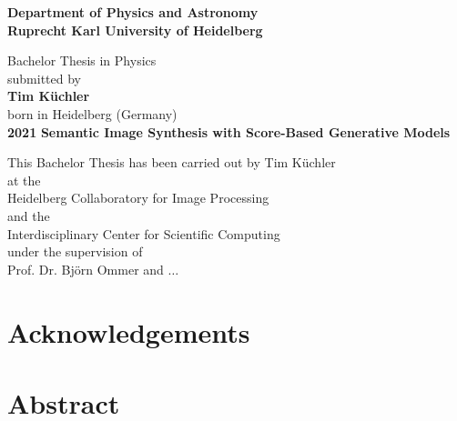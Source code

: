 \documentclass[a4paper, 12pt, oneside, BCOR=0cm]{scrbook}
\begin{document}
\begin{titlepage}
\begin{center}
    \Large\textbf{Department of Physics and Astronomy\\Ruprecht Karl University of Heidelberg}
    
    \vfill
    
    \large
    Bachelor Thesis in Physics\\
    submitted by\\
    \vspace{0.5cm}
    \Large\textbf{Tim Küchler}\\
    \normalsize
    \vspace{0.5cm}
    born in Heidelberg (Germany)\\
    \vspace{0.5cm}
    \Large\textbf{2021}
    \normalsize
    \afterpage{\blankpage}
    \newpage
    \thispagestyle{empty}
    \Large\textbf{Semantic Image Synthesis with Score-Based Generative Models}
    
    \vfill
    
    \large
    This Bachelor Thesis has been carried out by Tim Küchler\\
    at the\\
    Heidelberg Collaboratory for Image Processing\\
    and the\\
    Interdisciplinary Center for Scientific Computing\\
    under the supervision of\\
    Prof. Dr. Björn Ommer and $\dots$
    \afterpage{\blankpage}
\end{center}
\end{titlepage}
%
\frontmatter

\chapter*{Acknowledgements}
\thispagestyle{empty}

\afterpage{\blankpage}

\chapter*{Abstract}

\thispagestyle{empty}
\afterpage{\blankpage}

\setcounter{tocdepth}{1}
\tableofcontents
\thispagestyle{empty}
\afterpage{\blankpage}
\end{document}
